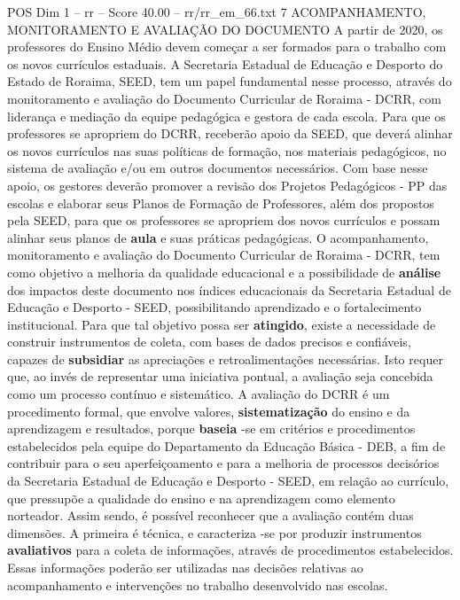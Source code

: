 \begin{textsample}{POS Dim 1 – rr – Score 40.00 – rr/rr\_em\_66.txt}  \label{ex:f1_pos_219}
7 ACOMPANHAMENTO, MONITORAMENTO E AVALIAÇÃO DO DOCUMENTO A partir de 2020, os professores do Ensino Médio devem começar a ser formados para o trabalho com os novos currículos estaduais.
A Secretaria Estadual de Educação e Desporto do Estado de Roraima, SEED, tem um papel fundamental nesse processo, através do monitoramento e avaliação do Documento Curricular de Roraima - DCRR, com liderança e mediação da equipe pedagógica e gestora de cada escola.
Para que os professores se apropriem do DCRR, receberão apoio da SEED, que deverá alinhar os novos currículos nas suas políticas de formação, nos materiais pedagógicos, no sistema de avaliação e/ou em outros documentos necessários.
Com base nesse apoio, os gestores deverão promover a revisão dos Projetos Pedagógicos - PP das escolas e elaborar seus Planos de Formação de Professores, além dos propostos pela SEED, para que os professores se apropriem dos novos currículos e possam alinhar seus planos de \textbf{aula} e suas práticas pedagógicas.
O acompanhamento, monitoramento e avaliação do Documento Curricular de Roraima - DCRR, tem como objetivo a melhoria da qualidade educacional e a possibilidade de \textbf{análise} dos impactos deste documento nos índices educacionais da Secretaria Estadual de Educação e Desporto - SEED, possibilitando aprendizado e o fortalecimento institucional.
Para que tal objetivo possa ser \textbf{atingido}, existe a necessidade de construir instrumentos de coleta, com bases de dados precisos e confiáveis, capazes de \textbf{subsidiar} as apreciações e retroalimentações necessárias.
Isto requer que, ao invés de representar uma iniciativa pontual, a avaliação seja concebida como um processo contínuo e sistemático.
A avaliação do DCRR é um procedimento formal, que envolve valores, \textbf{sistematização} do ensino e da aprendizagem e resultados, porque \textbf{baseia} -se em critérios e procedimentos estabelecidos pela equipe do Departamento da Educação Básica - DEB, a fim de contribuir para o seu aperfeiçoamento e para a melhoria de processos decisórios da Secretaria Estadual de Educação e Desporto - SEED, em relação ao currículo, que pressupõe a qualidade do ensino e na aprendizagem como elemento norteador.
Assim sendo, é possível reconhecer que a avaliação contém duas dimensões.
A primeira é técnica, e caracteriza -se por produzir instrumentos \textbf{avaliativos} para a coleta de informações, através de procedimentos estabelecidos.
Essas informações poderão ser utilizadas nas decisões relativas ao acompanhamento e intervenções no trabalho desenvolvido nas escolas.

\end{textsample}
